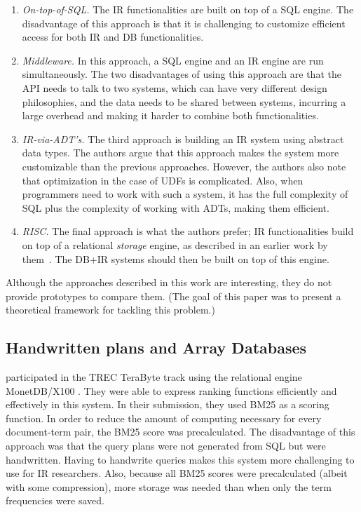 \begin{enumerate}
	\item \emph{On-top-of-SQL.} The IR functionalities are built on top of a SQL engine. The disadvantage of this approach is that it is challenging to customize efficient access for both IR and DB functionalities. 
	\item \emph{Middleware.} In this approach, a SQL engine and an IR engine are run simultaneously. The two disadvantages of using this approach are that the API needs to talk to two systems, which can have very different design philosophies, and the data needs to be shared between systems, incurring a large overhead and making it harder to combine both functionalities. 
	\item \emph{IR-via-ADT's.} The third approach is building an IR system using abstract data types. The authors argue that this approach makes the system more customizable than the previous approaches. However, the authors also note that optimization in the case of UDFs is complicated. Also, when programmers need to work with such a system, it has the full complexity of SQL plus the complexity of working with ADTs, making them efficient. 
	\item \emph{RISC.} The final approach is what the authors prefer; IR functionalities build on top of a relational \textit{storage} engine, as described in an earlier work by them~\citep{risc}. The DB+IR systems should then be built on top of this engine. 
\end{enumerate}  
Although the approaches described in this work are interesting, they do not provide prototypes to compare them. (The goal of this paper was to present a theoretical framework for tackling this problem.)

\subsection{Handwritten plans and Array Databases}
 participated in the TREC TeraByte track using the relational engine MonetDB/X100 \citep{monetdb/x100}. They were able to express ranking functions efficiently and effectively in this system. In their submission, they used BM25 as a scoring function. In order to reduce the amount of computing necessary for every document-term pair, the BM25 score was precalculated. 
The disadvantage of this approach was that the query plans were not generated from SQL but were handwritten. Having to handwrite queries makes this system more challenging to use for IR researchers. Also, because all BM25 scores were precalculated (albeit with some compression), more storage was needed than when only the term frequencies were saved.

